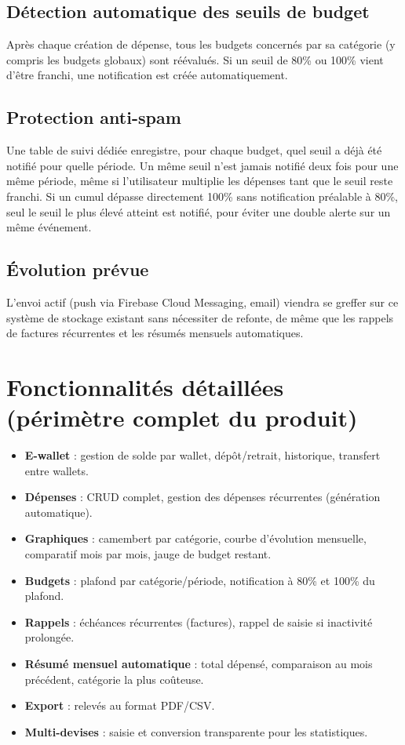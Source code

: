 \documentclass[11pt,a4paper]{article}
\begin{document}
\subsection{Détection automatique des seuils de budget}
Après chaque création de dépense, tous les budgets concernés par sa catégorie (y compris les budgets globaux) sont réévalués. Si un seuil de 80\% ou 100\% vient d'être franchi, une notification est créée automatiquement.

\subsection{Protection anti-spam}
Une table de suivi dédiée enregistre, pour chaque budget, quel seuil a déjà été notifié pour quelle période. Un même seuil n'est jamais notifié deux fois pour une même période, même si l'utilisateur multiplie les dépenses tant que le seuil reste franchi. Si un cumul dépasse directement 100\% sans notification préalable à 80\%, seul le seuil le plus élevé atteint est notifié, pour éviter une double alerte sur un même événement.

\subsection{Évolution prévue}
L'envoi actif (push via Firebase Cloud Messaging, email) viendra se greffer sur ce système de stockage existant sans nécessiter de refonte, de même que les rappels de factures récurrentes et les résumés mensuels automatiques.

\section{Fonctionnalités détaillées (périmètre complet du produit)}

\begin{itemize}[leftmargin=*]
    \item \textbf{E-wallet} : gestion de solde par wallet, dépôt/retrait, historique, transfert entre wallets.
    \item \textbf{Dépenses} : CRUD complet, gestion des dépenses récurrentes (génération automatique).
    \item \textbf{Graphiques} : camembert par catégorie, courbe d'évolution mensuelle, comparatif mois par mois, jauge de budget restant.
    \item \textbf{Budgets} : plafond par catégorie/période, notification à 80\% et 100\% du plafond.
    \item \textbf{Rappels} : échéances récurrentes (factures), rappel de saisie si inactivité prolongée.
    \item \textbf{Résumé mensuel automatique} : total dépensé, comparaison au mois précédent, catégorie la plus coûteuse.
    \item \textbf{Export} : relevés au format PDF/CSV.
    \item \textbf{Multi-devises} : saisie et conversion transparente pour les statistiques.
\end{itemize}
\end{document}
